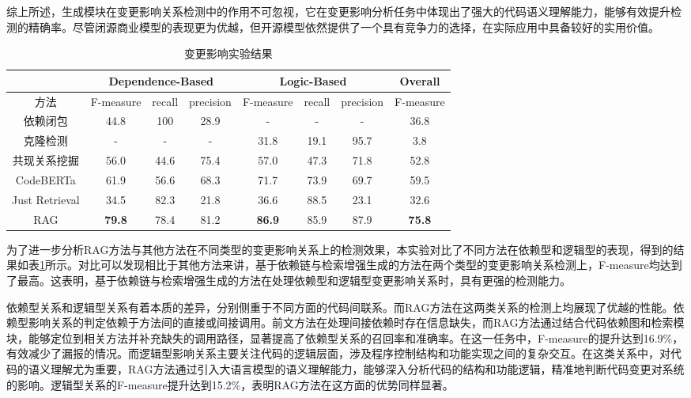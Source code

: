 综上所述，生成模块在变更影响关系检测中的作用不可忽视，它在变更影响分析任务中体现出了强大的代码语义理解能力，能够有效提升检测的精确率。尽管闭源商业模型的表现更为优越，但开源模型依然提供了一个具有竞争力的选择，在实际应用中具备较好的实用价值。

\begin{table}[htbp]
\caption{变更影响实验结果}
\label{2_变更影响实验结果}
\vspace{0.5em}\centering\wuhao
\begin{tabular}{c|ccc|ccc|c}
\toprule
  & \multicolumn{3}{c|}{Dependence-Based} & \multicolumn{3}{c|}{Logic-Based} & Overall \\
\midrule
方法 & F-measure & recall & precision & F-measure & recall & precision  
 & F-measure\\
\midrule
依赖闭包 &  44.8 & 100 & 28.9 & - & - & - & 36.8 \\
克隆检测 &  - & - & - & 31.8 & 19.1 & 95.7 & 3.8\\
共现关系挖掘 &  56.0 & 44.6 & 75.4 & 57.0 & 47.3 & 71.8 & 52.8\\
CodeBERTa  &   61.9 & 56.6 & 68.3 & 71.7 & 73.9 & 69.7 &59.5\\
Just Retrieval   & 34.5 & 82.3 & 21.8 & 36.6 & 88.5 & 23.1 & 32.6\\
RAG & \textbf{79.8} & 78.4 & 81.2 & \textbf{86.9} & 85.9 & 87.9 & \textbf{75.8}\\
\bottomrule
\end{tabular}
\end{table}

为了进一步分析RAG方法与其他方法在不同类型的变更影响关系上的检测效果，本实验对比了不同方法在依赖型和逻辑型的表现，得到的结果如表\ref{2_变更影响实验结果}所示。对比可以发现相比于其他方法来讲，基于依赖链与检索增强生成的方法在两个类型的变更影响关系检测上，F-measure均达到了最高。这表明，基于依赖链与检索增强生成的方法在处理依赖型和逻辑型变更影响关系时，具有更强的检测能力。

依赖型关系和逻辑型关系有着本质的差异，分别侧重于不同方面的代码间联系。而RAG方法在这两类关系的检测上均展现了优越的性能。依赖型影响关系的判定依赖于方法间的直接或间接调用。前文方法在处理间接依赖时存在信息缺失，而RAG方法通过结合代码依赖图和检索模块，能够定位到相关方法并补充缺失的调用路径，显著提高了依赖型关系的召回率和准确率。在这一任务中，F-measure的提升达到16.9\%，有效减少了漏报的情况。而逻辑型影响关系主要关注代码的逻辑层面，涉及程序控制结构和功能实现之间的复杂交互。在这类关系中，对代码的语义理解尤为重要，RAG方法通过引入大语言模型的语义理解能力，能够深入分析代码的结构和功能逻辑，精准地判断代码变更对系统的影响。逻辑型关系的F-measure提升达到15.2\%，表明RAG方法在这方面的优势同样显著。


